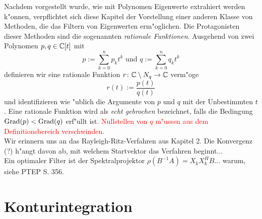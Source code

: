 Nachdem vorgestellt wurde, wie mit Polynomen Eigenwerte extrahiert werden k"onnen,
verpflichtet sich diese Kapitel der Vorstellung einer anderen Klasse von Methoden, die
das Filtern von Eigenwerten erm"oglichen. Die Protagonisten dieser Methoden sind
die sogenannten \emph{rationale Funktionen}. Ausgehend
von zwei Polynomen $p, q\in\mathbb{C} [t]$ mit
\[
p := \sum_{k=0}^n p_k t^k \text{ \ und\ } q := \sum_{k=0}^n q_k t^k
\]
definieren wir eine rationale Funktion $r\colon\mathbb{C}\setminus{N_q}\to\mathbb{C}$ verm"oge
\[
r(t) := \frac{p(t)}{q(t)}
\]
und identifizieren wie "ublich die Argumente von $p$ und $q$ mit der Unbestimmten $t$.
Eine rationale Funktion wird als \emph{echt gebrochen} bezeichnet, falls die
Bedingung $\operatorname{Grad}(p) < \operatorname{Grad}(q)$ erf"ullt ist.
\textcolor{red}{Nullstellen von $q$ m"ussen aus dem Definitionsbereich verschwinden.}\\

Wir erinnern uns an das Rayleigh-Ritz-Verfahren aus Kapitel 2. Die Konvergenz (?)
h"angt davon ab, mit welchem Startvektor das Verfahren beginnt...\\

Ein optimaler Filter ist der Spektralprojektor $\rho(B^{-1}A) = X_k X_k^H B$... warum, siehe PTEP S. 356.

\section{Konturintegration}
